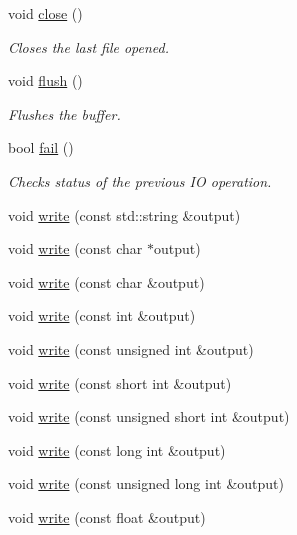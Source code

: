 \begin{DoxyCompactItemize}
\item 
void \mbox{\hyperlink{classENSEM_1_1TextWriter_a8b65ccb4936fe8b05492e4f30983b7ee}{close}} ()
\begin{DoxyCompactList}\small\item\em Closes the last file opened. \end{DoxyCompactList}\item 
void \mbox{\hyperlink{classENSEM_1_1TextWriter_a6062726c44aa7c500a065a416ae03a67}{flush}} ()
\begin{DoxyCompactList}\small\item\em Flushes the buffer. \end{DoxyCompactList}\item 
bool \mbox{\hyperlink{classENSEM_1_1TextWriter_a924bbfa5f3bd8f1dbb3f856b1db8b9be}{fail}} ()
\begin{DoxyCompactList}\small\item\em Checks status of the previous IO operation. \end{DoxyCompactList}\item 
void \mbox{\hyperlink{classENSEM_1_1TextWriter_a46f85ca8047ad9b0419c1f8e40847b52}{write}} (const std\+::string \&output)
\item 
void \mbox{\hyperlink{classENSEM_1_1TextWriter_ae8a8946f8f52884017f52cd69f809ba2}{write}} (const char $\ast$output)
\item 
void \mbox{\hyperlink{classENSEM_1_1TextWriter_aef9f6c18d6d6995fadc116b65e58b35a}{write}} (const char \&output)
\item 
void \mbox{\hyperlink{classENSEM_1_1TextWriter_a833d3d5526cb2f48b0674df3635f7bf3}{write}} (const int \&output)
\item 
void \mbox{\hyperlink{classENSEM_1_1TextWriter_aeca2b6ad3ab9353c98220345c8f8edfe}{write}} (const unsigned int \&output)
\item 
void \mbox{\hyperlink{classENSEM_1_1TextWriter_af8e02d2f0ce493c50698a7999af9596c}{write}} (const short int \&output)
\item 
void \mbox{\hyperlink{classENSEM_1_1TextWriter_a7c3f545361114dcb952b07151188c18c}{write}} (const unsigned short int \&output)
\item 
void \mbox{\hyperlink{classENSEM_1_1TextWriter_a2bf45b3cde030d81948d6b13e5c76437}{write}} (const long int \&output)
\item 
void \mbox{\hyperlink{classENSEM_1_1TextWriter_ab619ef20f83f064bddb2ba4e5ab2b9dc}{write}} (const unsigned long int \&output)
\item 
void \mbox{\hyperlink{classENSEM_1_1TextWriter_a7209fb322f222a9d7354a0b03bc2c61c}{write}} (const float \&output)

\end{DoxyCompactItemize}
